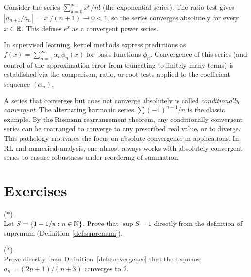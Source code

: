 \documentclass[11pt,a4paper]{article}
\begin{document}
\begin{example}
\label{ex:ratio_test}
Consider the series $\sum_{n=0}^\infty x^n / n!$ (the exponential
series). The ratio test gives
$|a_{n+1}/a_n| = |x|/(n+1) \to 0 < 1$,
so the series converges absolutely for every $x \in \mathbb{R}$. This defines
$e^x$ as a convergent power series.
\end{example}

\begin{rlconnection}[title={Series convergence in function approximation}]
In supervised learning, kernel methods express predictions as
$f(x) = \sum_{n=1}^\infty \alpha_n \phi_n(x)$ for basis functions
$\phi_n$. Convergence of this series (and control of the approximation
error from truncating to finitely many terms) is established via the
comparison, ratio, or root tests applied to the coefficient sequence
$(\alpha_n)$.
\end{rlconnection}

\begin{remark}
\label{rem:conditional}
A series that converges but does not converge absolutely is called
\emph{conditionally convergent}. The alternating harmonic series
$\sum (-1)^{n+1}/n$ is the classic example. By the Riemann
rearrangement theorem, any conditionally convergent series can be
rearranged to converge to any prescribed real value, or to diverge.
This pathology motivates the focus on absolute convergence in
applications. In RL and numerical analysis, one almost always works
with absolutely convergent series to ensure robustness under reordering
of summation.
\end{remark}

\section{Exercises}
\label{sec:exercises}

\begin{exercise}
\textnormal{(\(*\))} \\
Let $S = \{1 - 1/n : n \in \mathbb{N}\}$. Prove that $\sup S = 1$ directly from
the definition of supremum (Definition~\ref{def:supremum}).
\end{exercise}

\begin{exercise}
\textnormal{(\(*\))} \\
Prove directly from Definition~\ref{def:convergence} that the sequence
$a_n = (2n+1)/(n+3)$ converges to $2$.
\end{exercise}
\end{document}
